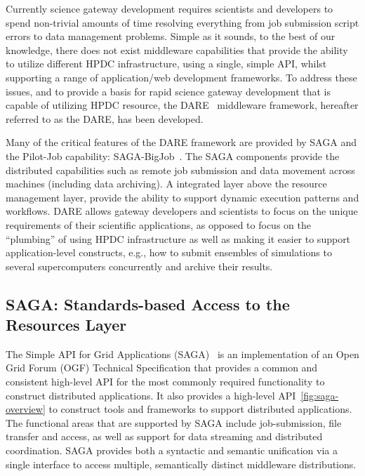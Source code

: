\documentclass[]{svjour3}
\begin{document}
Currently science gateway development requires scientists and
developers to spend non-trivial amounts of time resolving everything
from job submission script errors to data management problems. Simple
as it sounds, to the best of our knowledge, there does not exist
middleware capabilities that provide the ability to utilize different
HPDC infrastructure, using a single, simple API, whilst supporting a
range of application/web development frameworks.  To address these
issues, and to provide a basis for rapid science gateway development
that is capable of utilizing HPDC resource, the DARE~\cite{dareurl}
middleware framework, hereafter referred to as the DARE, has been
developed.

Many of the critical features of the DARE framework are provided by
SAGA and the Pilot-Job capability:
SAGA-BigJob~\cite{saga_bigjob_condor_cloud}.  The SAGA components
provide the distributed capabilities such as remote job submission and
data movement across machines (including data archiving).  A
integrated layer above the resource management layer, provide the
ability to support dynamic execution patterns and workflows.  
DARE allows gateway developers and scientists to focus on the unique
requirements of their scientific applications, as opposed to focus on
the ``plumbing'' of using HPDC infrastructure as well as making it
easier to support application-level constructs, e.g., how to submit
ensembles of simulations to several supercomputers concurrently and
archive their results.


 

\subsection{SAGA: Standards-based Access to the Resources Layer}

The Simple API for Grid Applications (SAGA)~\cite{saga_url} is an
implementation of an Open Grid Forum (OGF) Technical Specification
that provides a common and consistent high-level API for the most
commonly required functionality to construct distributed
applications. It also provides a high-level
API~\ref{fig:saga-overview} to construct tools and frameworks to
support distributed applications. The functional areas that are
supported by SAGA include job-submission, file transfer and access, as
well as support for data streaming and distributed coordination.  SAGA
provides both a syntactic and semantic unification via a single
interface to access multiple, semantically distinct middleware
distributions.
\end{document}
